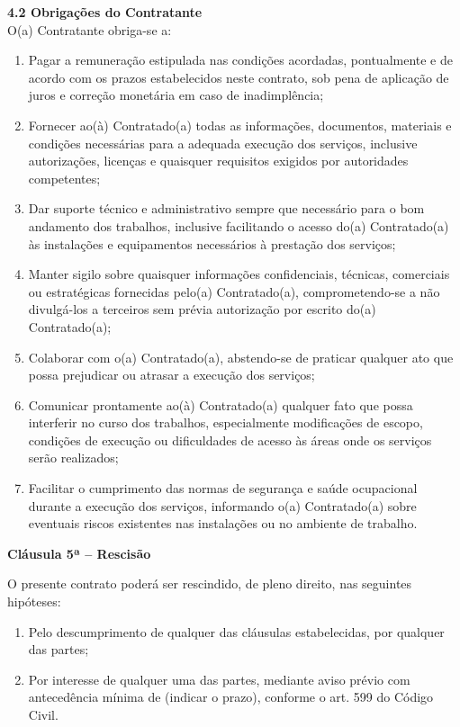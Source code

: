 \documentclass[a4paper,12pt]{article}
\begin{document}
\textbf{4.2 Obrigações do Contratante}\\ 
O(a) Contratante obriga-se a:
\begin{enumerate}[label=\alph*)]
    \item Pagar a remuneração estipulada nas condições acordadas, pontualmente e de acordo com os prazos estabelecidos neste contrato, sob pena de aplicação de juros e correção monetária em caso de inadimplência;
    \item Fornecer ao(à) Contratado(a) todas as informações, documentos, materiais e condições necessárias para a adequada execução dos serviços, inclusive autorizações, licenças e quaisquer requisitos exigidos por autoridades competentes;
    \item Dar suporte técnico e administrativo sempre que necessário para o bom andamento dos trabalhos, inclusive facilitando o acesso do(a) Contratado(a) às instalações e equipamentos necessários à prestação dos serviços;
    \item Manter sigilo sobre quaisquer informações confidenciais, técnicas, comerciais ou estratégicas fornecidas pelo(a) Contratado(a), comprometendo-se a não divulgá-los a terceiros sem prévia autorização por escrito do(a) Contratado(a);
    \item Colaborar com o(a) Contratado(a), abstendo-se de praticar qualquer ato que possa prejudicar ou atrasar a execução dos serviços;
    \item Comunicar prontamente ao(à) Contratado(a) qualquer fato que possa interferir no curso dos trabalhos, especialmente modificações de escopo, condições de execução ou dificuldades de acesso às áreas onde os serviços serão realizados;
    \item Facilitar o cumprimento das normas de segurança e saúde ocupacional durante a execução dos serviços, informando o(a) Contratado(a) sobre eventuais riscos existentes nas instalações ou no ambiente de trabalho.
\end{enumerate}

\large{\textbf{Cláusula 5ª – Rescisão}}
\normalsize

O presente contrato poderá ser rescindido, de pleno direito, nas seguintes hipóteses:
\begin{enumerate}[label=\alph*)]
    \item Pelo descumprimento de qualquer das cláusulas estabelecidas, por qualquer das partes;
    \item Por interesse de qualquer uma das partes, mediante aviso prévio com antecedência mínima de (indicar o prazo), conforme o art. 599 do Código Civil.
\end{enumerate}
\end{document}
